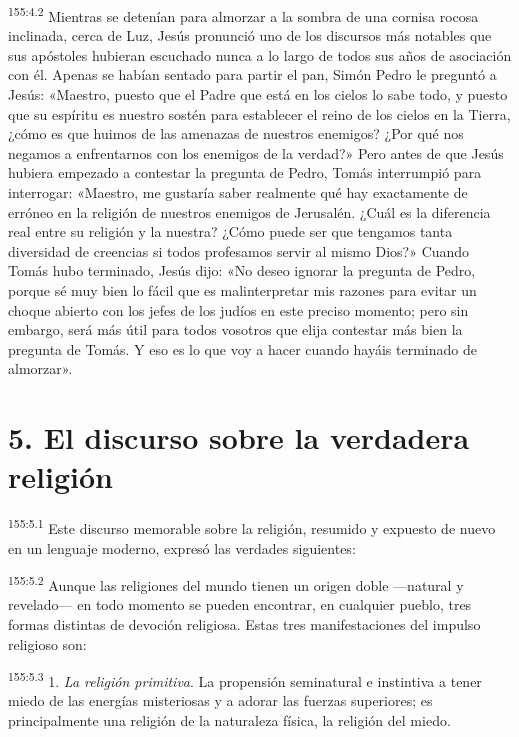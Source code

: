 \par
\textsuperscript{155:4.2} Mientras se detenían para almorzar a la sombra de una cornisa rocosa inclinada, cerca de Luz, Jesús pronunció uno de los discursos más notables que sus apóstoles hubieran escuchado nunca a lo largo de todos sus años de asociación con él. Apenas se habían sentado para partir el pan, Simón Pedro le preguntó a Jesús: «Maestro, puesto que el Padre que está en los cielos lo sabe todo, y puesto que su espíritu es nuestro sostén para establecer el reino de los cielos en la Tierra, ¿cómo es que huimos de las amenazas de nuestros enemigos? ¿Por qué nos negamos a enfrentarnos con los enemigos de la verdad?» Pero antes de que Jesús hubiera empezado a contestar la pregunta de Pedro, Tomás interrumpió para interrogar: «Maestro, me gustaría saber realmente qué hay exactamente de erróneo en la religión de nuestros enemigos de Jerusalén. ¿Cuál es la diferencia real entre su religión y la nuestra? ¿Cómo puede ser que tengamos tanta diversidad de creencias si todos profesamos servir al mismo Dios?» Cuando Tomás hubo terminado, Jesús dijo: «No deseo ignorar la pregunta de Pedro, porque sé muy bien lo fácil que es malinterpretar mis razones para evitar un choque abierto con los jefes de los judíos en este preciso momento; pero sin embargo, será más útil para todos vosotros que elija contestar más bien la pregunta de Tomás. Y eso es lo que voy a hacer cuando hayáis terminado de almorzar».

\section*{5. El discurso sobre la verdadera religión}
\par
\textsuperscript{155:5.1} Este discurso memorable sobre la religión, resumido y expuesto de nuevo en un lenguaje moderno, expresó las verdades siguientes:

\par
\textsuperscript{155:5.2} Aunque las religiones del mundo tienen un origen doble ---natural y revelado--- en todo momento se pueden encontrar, en cualquier pueblo, tres formas distintas de devoción religiosa. Estas tres manifestaciones del impulso religioso son:

\par
\textsuperscript{155:5.3} 1. \textit{La religión primitiva}. La propensión seminatural e instintiva a tener miedo de las energías misteriosas y a adorar las fuerzas superiores; es principalmente una religión de la naturaleza física, la religión del miedo.

